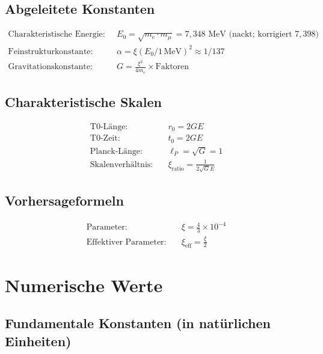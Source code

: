 	\subsection{Abgeleitete Konstanten}
	
	\begin{align}
		\text{Charakteristische Energie:} \quad & E_0 = \sqrt{m_e \cdot m_\mu} = 7{,}348 \text{ MeV (nackt; korrigiert } 7{,}398\text{)} \\
		\text{Feinstrukturkonstante:} \quad & \alpha = \xi (E_0/1\,\text{MeV})^2 \approx 1/137 \\
		\text{Gravitationskonstante:} \quad & G = \frac{\xi^2}{4m_e} \times \text{Faktoren}
	\end{align}
	
	\subsection{Charakteristische Skalen}
	
	\begin{align}
		\text{T0-Länge:} \quad & r_0 = 2GE \\
		\text{T0-Zeit:} \quad & t_0 = 2GE \\
		\text{Planck-Länge:} \quad & \ell_P = \sqrt{G} = 1 \\
		\text{Skalenverhältnis:} \quad & \xi_{\text{ratio}} = \frac{1}{2\sqrt{G} E}
	\end{align}
	
	\subsection{Vorhersageformeln}
	
	\begin{align}
		\text{Parameter:} \quad & \xi = \frac{4}{3} \times 10^{-4} \\
		\text{Effektiver Parameter:} \quad & \xi_{\text{eff}} = \frac{\xi}{2}
	\end{align}
	
	\section{Numerische Werte}
	\label{sec:numerical_values}
	
	\subsection{Fundamentale Konstanten (in natürlichen Einheiten)}
	
